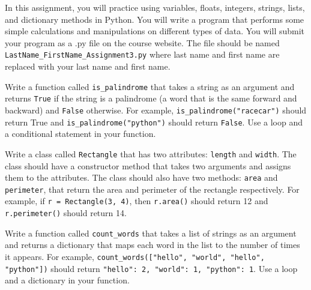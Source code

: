 \documentclass{homework}
\begin{document}
\maketitle

In this assignment, you will practice using variables, floats, integers, strings, lists, and dictionary methods in Python. You will write a program that performs some simple calculations and manipulations on different types of data. You will submit your program as a .py file on the course website. The file should be named \texttt{LastName\_FirstName\_Assignment3.py} where last name and first name are replaced with your last name and first name.\\

\begin{problem}[1]

    Write a function called \texttt{is\_palindrome} that takes a string as an argument and returns \texttt{True} if the string is a palindrome (a word that is the same forward and backward) and \texttt{False} otherwise. For example, \texttt{is\_palindrome("racecar")} should return True and \texttt{is\_palindrome("python")} should return \texttt{False}. Use a loop and a conditional statement in your function.

\end{problem}

\begin{problem}[2]

    Write a class called \texttt{Rectangle} that has two attributes: \texttt{length} and \texttt{width}. The class should have a constructor method that takes two arguments and assigns them to the attributes. The class should also have two methods: \texttt{area} and \texttt{perimeter}, that return the area and perimeter of the rectangle respectively. For example, if \texttt{r = Rectangle(3, 4)}, then \texttt{r.area()} should return 12 and \texttt{r.perimeter()} should return 14.
\end{problem}

\begin{problem}[3]

    Write a function called \texttt{count\_words} that takes a list of strings as an argument and returns a dictionary that maps each word in the list to the number of times it appears. For example, \texttt{count\_words(["hello", "world", "hello", "python"])} should return \texttt{{"hello": 2, "world": 1, "python": 1}}. Use a loop and a dictionary in your function.
\end{problem}
\end{document}
